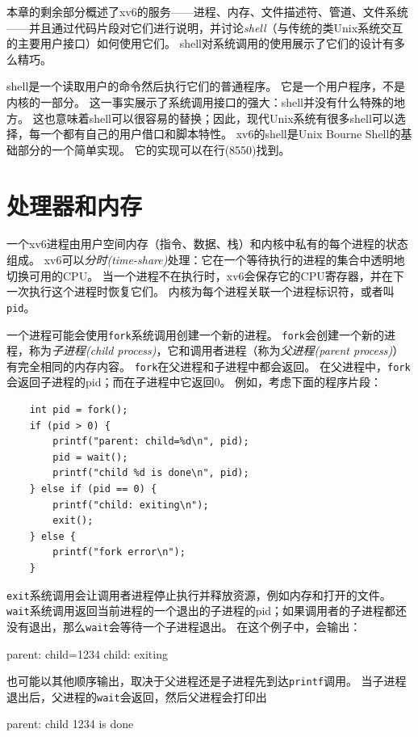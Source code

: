 本章的剩余部分概述了xv6的服务——进程、内存、文件描述符、管道、文件系统——并且通过代码片段对它们进行说明，并讨论\emph{shell}（与传统的类Unix系统交互的主要用户接口）如何使用它们。
shell对系统调用的使用展示了它们的设计有多么精巧。

shell是一个读取用户的命令然后执行它们的普通程序。
它是一个用户程序，不是内核的一部分。
这一事实展示了系统调用接口的强大：shell并没有什么特殊的地方。
这也意味着shell可以很容易的替换；因此，现代Unix系统有很多shell可以选择，每一个都有自己的用户借口和脚本特性。
xv6的shell是Unix Bourne Shell的基础部分的一个简单实现。
它的实现可以在行(8550)找到。

\section*{处理器和内存}

一个xv6进程由用户空间内存（指令、数据、栈）和内核中私有的每个进程的状态组成。
xv6可以\emph{分时(time-share)}处理：它在一个等待执行的进程的集合中透明地切换可用的CPU。
当一个进程不在执行时，xv6会保存它的CPU寄存器，并在下一次执行这个进程时恢复它们。
内核为每个进程关联一个进程标识符，或者叫\texttt{pid}。

一个进程可能会使用\texttt{fork}系统调用创建一个新的进程。
\texttt{fork}会创建一个新的进程，称为\emph{子进程(child process)}，它和调用者进程（称为\emph{父进程(parent process)}）有完全相同的内存内容。
\texttt{fork}在父进程和子进程中都会返回。
在父进程中，\texttt{fork}会返回子进程的pid；而在子进程中它返回0。
例如，考虑下面的程序片段：

\begin{lstlisting}
    int pid = fork();
    if (pid > 0) {
        printf("parent: child=%d\n", pid);
        pid = wait();
        printf("child %d is done\n", pid);
    } else if (pid == 0) {
        printf("child: exiting\n");
        exit();
    } else {
        printf("fork error\n");
    }
\end{lstlisting}

\texttt{exit}系统调用会让调用者进程停止执行并释放资源，例如内存和打开的文件。
\texttt{wait}系统调用返回当前进程的一个退出的子进程的pid；如果调用者的子进程都还没有退出，那么\texttt{wait}会等待一个子进程退出。
在这个例子中，会输出：
\begin{blacklisting}
    parent: child=1234
    child: exiting
\end{blacklisting}    

也可能以其他顺序输出，取决于父进程还是子进程先到达\texttt{printf}调用。
当子进程退出后，父进程的\texttt{wait}会返回，然后父进程会打印出
\begin{blacklisting}
    parent: child 1234 is done
\end{blacklisting}

